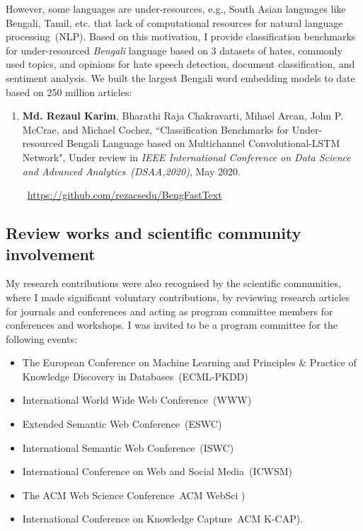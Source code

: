 \begin{appendices}
\hspace*{5mm} However, some languages are under-resources, e.g., South Asian languages like Bengali, Tamil, etc. that lack of computational resources for natural language processing~(NLP). Based on this motivation, I provide classification benchmarks for under-resourced \textit{Bengali} language based on 3 datasets of hates, commonly used topics, and opinions for hate speech detection, document classification, and sentiment analysis. We built the largest Bengali word embedding models to date based on 250 million articles:

\begin{enumerate}[noitemsep]
	\item \textbf{Md. Rezaul Karim}, Bharathi Raja Chakravarti, Mihael Arcan, John P. McCrae, and Michael Cochez, ``Classification Benchmarks for Under-resourced Bengali Language based on Multichannel Convolutional-LSTM Network", Under review in \emph{IEEE International Conference on Data Science and Advanced Analytics~(DSAA,2020)}, May 2020.
	
	\faGithub~\url{https://github.com/rezacsedu/BengFastText}
\end{enumerate}

\subsection*{Review works and scientific community involvement}%
My research contributions were also recognised by the scientific communities, where I made significant voluntary contributions, by reviewing research articles for journals and conferences and acting as program committee members for conferences and workshops. I was invited to be a program committee for the following events:

\begin{itemize}[noitemsep]
    \item The European Conference on Machine Learning and Principles \& Practice of Knowledge Discovery in Databases~(ECML-PKDD)
    \item International World Wide Web Conference~(WWW)
    \item Extended Semantic Web Conference~(ESWC) 
    \item International Semantic Web Conference~(ISWC) 
    \item International Conference on Web and Social Media~(ICWSM) 
    \item The ACM Web Science Conference~ACM WebSci )
    \item International Conference on Knowledge Capture~ACM K-CAP).
\end{itemize}


\end{appendices}
